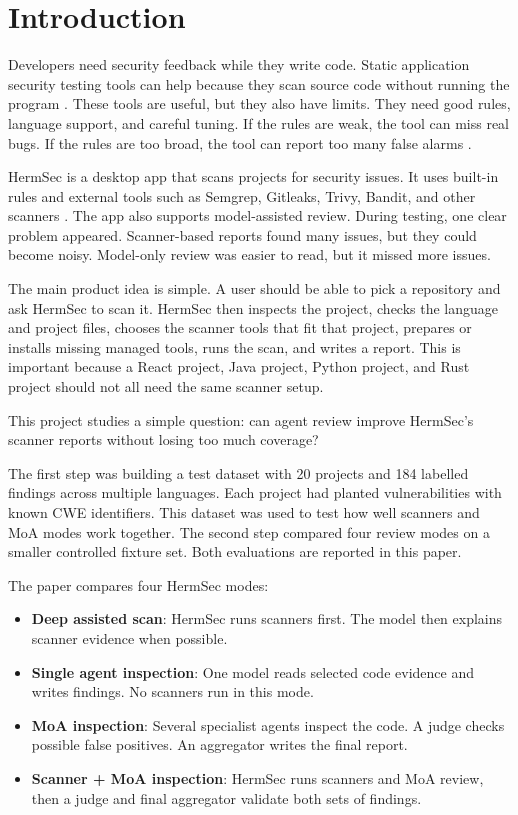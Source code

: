 \documentclass[sigconf,nonacm]{acmart}
\begin{document}
\maketitle

\section{Introduction}
Developers need security feedback while they write code. Static application security testing tools can help because they scan source code without running the program \cite{chess2004static,livshits2005finding}. These tools are useful, but they also have limits. They need good rules, language support, and careful tuning. If the rules are weak, the tool can miss real bugs. If the rules are too broad, the tool can report too many false alarms \cite{zitser2004testing}.

HermSec is a desktop app that scans projects for security issues. It uses built-in rules and external tools such as Semgrep, Gitleaks, Trivy, Bandit, and other scanners \cite{semgrep,gitleaks,trivy,bandit}. The app also supports model-assisted review. During testing, one clear problem appeared. Scanner-based reports found many issues, but they could become noisy. Model-only review was easier to read, but it missed more issues.

The main product idea is simple. A user should be able to pick a repository and ask HermSec to scan it. HermSec then inspects the project, checks the language and project files, chooses the scanner tools that fit that project, prepares or installs missing managed tools, runs the scan, and writes a report. This is important because a React project, Java project, Python project, and Rust project should not all need the same scanner setup.

This project studies a simple question: can agent review improve HermSec's scanner reports without losing too much coverage?

The first step was building a test dataset with 20 projects and 184 labelled findings across multiple languages. Each project had planted vulnerabilities with known CWE identifiers. This dataset was used to test how well scanners and MoA modes work together. The second step compared four review modes on a smaller controlled fixture set. Both evaluations are reported in this paper.

The paper compares four HermSec modes:

\begin{itemize}
  \item \textbf{Deep assisted scan}: HermSec runs scanners first. The model then explains scanner evidence when possible.
  \item \textbf{Single agent inspection}: One model reads selected code evidence and writes findings. No scanners run in this mode.
  \item \textbf{MoA inspection}: Several specialist agents inspect the code. A judge checks possible false positives. An aggregator writes the final report.
  \item \textbf{Scanner + MoA inspection}: HermSec runs scanners and MoA review, then a judge and final aggregator validate both sets of findings.
\end{itemize}
\end{document}
